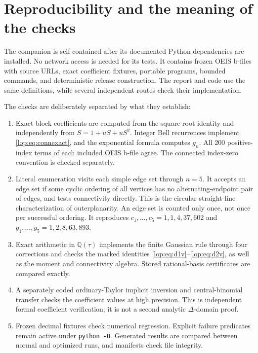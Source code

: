 \documentclass[11pt,letterpaper]{article}
\numberwithin{equation}{section}
\theoremstyle{remark}\newtheorem{remark}[theorem]{Remark}
\newcommand{\QQ}{\mathbb Q}
\begin{document}
\section{Reproducibility and the meaning of the checks}\label{lop:sec:checks}

The companion is self-contained after its documented Python dependencies
are installed. No network access is needed for its tests. It contains
frozen OEIS b-files with source URLs, exact coefficient fixtures, portable
programs, bounded commands, and deterministic release construction.
The report and code use the same definitions, while several independent
routes check their implementation.

The checks are deliberately separated by what they establish:
\begin{enumerate}
\item Exact block coefficients are computed from the square-root identity
and independently from $S=1+uS+uS^2$. Integer Bell recurrences implement
\eqref{lop:eq:connexact}, and the exponential formula computes $g_n$.
All 200 positive-index terms of each included OEIS b-file agree.
The connected index-zero convention is checked separately.
\item Literal enumeration visits each simple edge set through $n=5$.
It accepts an edge set if some cyclic ordering of all vertices has no
alternating-endpoint pair of edges, and tests connectivity directly.
This is the circular straight-line characterization of outerplanarity.
An edge set is counted only once, not once per successful ordering.
It reproduces $c_1,\ldots,c_5=1,1,4,37,602$ and
$g_1,\ldots,g_5=1,2,8,63,893$.
\item Exact arithmetic in $\QQ(\tau)$ implements the finite Gaussian
rule through four corrections and checks the marked identities
\eqref{lop:eq:d1v}--\eqref{lop:eq:d2v}, as well as the moment and connectivity
algebra. Stored rational-basis certificates are compared exactly.
\item A separately coded ordinary-Taylor implicit inversion and
central-binomial transfer checks the coefficient values at high
precision. This is independent formal coefficient verification; it
is not a second analytic $\Delta$-domain proof.
\item Frozen decimal fixtures check numerical regression. Explicit
failure predicates remain active under \texttt{python -O}. Generated
results are compared between normal and optimized runs, and manifests
check file integrity.
\end{enumerate}
\end{document}

